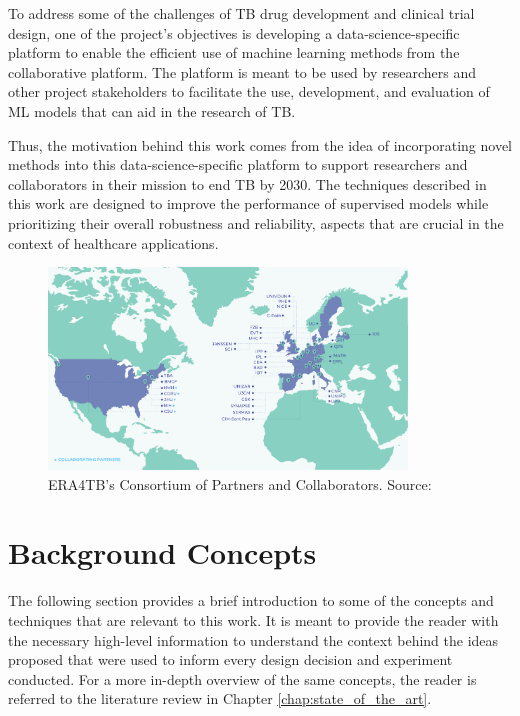 \documentclass[../main.tex]{subfiles}
\begin{document}
    To address some of the challenges of TB drug development and clinical trial design, one of the project's objectives is developing a data-science-specific platform to enable the efficient use of machine learning methods from the collaborative platform. The platform is meant to be used by researchers and other project stakeholders to facilitate the use, development, and evaluation of ML models that can aid in the research of TB.

    \vspace{0.5cm}

    Thus, the motivation behind this work comes from the idea of incorporating novel methods into this data-science-specific platform to support researchers and collaborators in their mission to end TB by 2030. The techniques described in this work are designed to improve the performance of supervised models while prioritizing their overall robustness and reliability, aspects that are crucial in the context of healthcare applications.

    \begin{figure}[H]
        \centering
        \includegraphics[width=0.85\textwidth]{figures/ERA4TB_map.png}
        \caption{ERA4TB's Consortium of Partners and Collaborators. Source: \cite{noauthor_era4tb}}
        \label{fig:era4tb}
    \end{figure}

    \section{Background Concepts} \label{sec:background}
    
    The following section provides a brief introduction to some of the concepts and techniques that are relevant to this work. It is meant to provide the reader with the necessary high-level information to understand the context behind the ideas proposed that were used to inform every design decision and experiment conducted. For a more in-depth overview of the same concepts, the reader is referred to the literature review in Chapter \ref{chap:state_of_the_art}.
\end{document}
